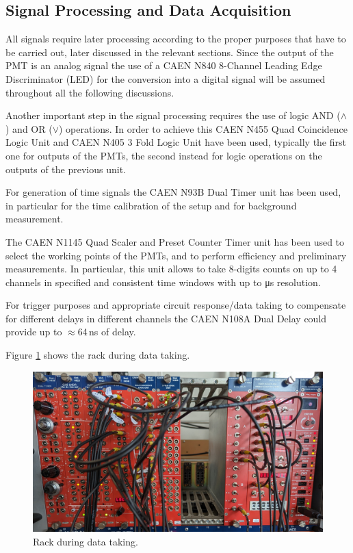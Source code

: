 \documentclass[../main.tex]{subfiles}
\begin{document}
\subsection{Signal Processing and Data Acquisition}
All signals require later processing according to the proper purposes that have to be carried out, later discussed in the relevant sections. Since the output of the PMT is an analog signal the use of a CAEN N840 8-Channel Leading Edge Discriminator (LED) for the conversion into a digital signal will be assumed throughout all the following discussions.

Another important step in the signal processing requires the use of logic AND ($\land$) and OR ($\lor$) operations. In order to achieve this CAEN N455 Quad Coincidence Logic Unit and CAEN N405 3 Fold Logic Unit have been used, typically the first one for outputs of the PMTs, the second instead for logic operations on the outputs of the previous unit.

For generation of time signals the CAEN N93B Dual Timer unit has been used, in particular for the time calibration of the setup and for background measurement.

The CAEN N1145 Quad Scaler and Preset Counter Timer unit has been used to select the working points of the PMTs, and to perform efficiency and preliminary measurements. In particular, this unit allows to take 8-digits counts on up to 4 channels in specified and consistent time windows with up to \unit{\micro \second} resolution.

For trigger purposes and appropriate circuit response/data taking to compensate for different delays in different channels the CAEN N108A Dual Delay could provide up to \mbox{$\approx$64\,ns} of delay.

Figure \ref{fig:rack} shows the rack during data taking.\\

\begin{figure}[htb]
    \centering
    \includegraphics[width=0.7 \linewidth]{images/rack.jpg}
    \caption{Rack during data taking.}
    \label{fig:rack}
\end{figure}
\end{document}
